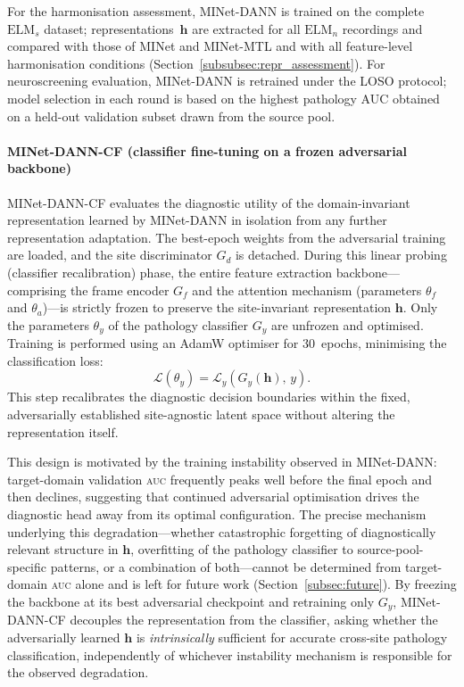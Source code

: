 \documentclass[preprint,12pt]{elsarticle}
\begin{document}
For the harmonisation assessment, MINet-DANN is trained on the
complete $\mathrm{ELM}_s$ dataset; representations~$\mathbf{h}$ are
extracted for all $\mathrm{ELM}_n$ recordings and compared with those
of MINet and MINet-MTL and with all feature-level harmonisation
conditions (Section~\ref{subsubsec:repr_assessment}).
For neuroscreening evaluation, MINet-DANN is retrained under the LOSO
protocol; model selection in each round is based on the highest
pathology AUC obtained on a held-out validation subset drawn from the
source pool.

\paragraph{MINet-DANN-CF (classifier fine-tuning on a frozen
adversarial backbone)}
\label{par:MINet-DANN-CF}
MINet-DANN-CF evaluates the diagnostic utility of the domain-invariant representation learned by MINet-DANN in isolation from any further representation adaptation. The best-epoch weights from the adversarial training are loaded, and the site discriminator $G_d$ is detached. During this linear probing (classifier recalibration) phase, the entire feature extraction backbone---comprising the frame encoder $G_f$ and the attention mechanism (parameters $\theta_f$ and $\theta_a$)---is strictly frozen to preserve the site-invariant representation $\mathbf{h}$. Only the parameters $\theta_y$ of the pathology classifier $G_y$ are unfrozen and optimised. Training is performed using an AdamW optimiser for 30~epochs, minimising the classification loss:
\begin{equation}
    \mathcal{L}(\theta_y) = \mathcal{L}_y\!\left(G_y(\mathbf{h}),\,y\right).
\end{equation}
This step recalibrates the diagnostic decision boundaries within the
fixed, adversarially established site-agnostic latent space without
altering the representation itself.

This design is motivated by the training instability observed in
\mbox{MINet-DANN}: target-domain validation \textsc{auc} frequently
peaks well before the final epoch and then declines, suggesting that
continued adversarial optimisation drives the diagnostic head away from
its optimal configuration.
The precise mechanism underlying this degradation---whether
catastrophic forgetting of diagnostically relevant structure in
$\mathbf{h}$, overfitting of the pathology classifier to
source-pool-specific patterns, or a combination of
both---cannot be determined from target-domain \textsc{auc} alone and is
left for future work (Section~\ref{subsec:future}).
By freezing the backbone at its best adversarial checkpoint and
retraining only $G_y$, \mbox{MINet-DANN-CF} decouples the
representation from the classifier, asking whether the adversarially
learned $\mathbf{h}$ is \emph{intrinsically} sufficient for accurate
cross-site pathology classification, independently of whichever
instability mechanism is responsible for the observed degradation.
\end{document}
